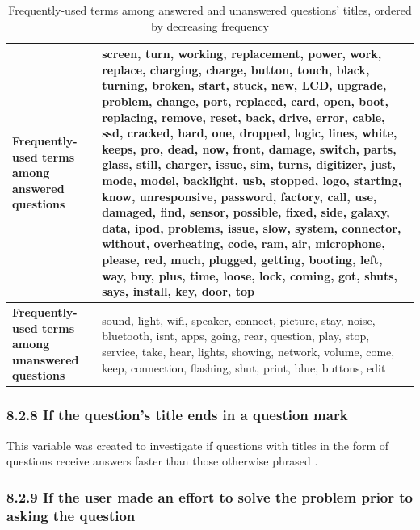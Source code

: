 \documentclass{article}
\begin{document}
\begin{table}[!htbp]
\centering
\begin{tabular}{|L{4cm}|L{8cm}|}
  \hline
 \textbf{Frequently-used terms among answered questions} & screen, turn, working, replacement, power, work, replace, charging, charge, button, touch, black, turning, broken, start, stuck, new, LCD, upgrade, problem, change, port, replaced, card, open, boot, replacing, remove, reset, back, drive, error, cable, ssd, cracked, hard, one, dropped, logic, lines, white, keeps, pro, dead, now, front, damage, switch, parts, glass, still, charger, issue, sim, turns, digitizer, just, mode, model, backlight, usb, stopped, logo, starting, know, unresponsive, password, factory, call, use, damaged, find, sensor, possible, fixed, side, galaxy, data, ipod, problems, issue, slow, system, connector, without, overheating, code, ram, air, microphone, please, red, much, plugged, getting, booting, left, way, buy, plus, time, loose, lock, coming, got, shuts, says, install, key, door, top \\
  \hline
  \textbf{Frequently-used terms among unanswered questions} & sound, light, wifi, speaker, connect, picture, stay, noise, bluetooth, isnt, apps, going, rear, question, play, stop, service, take, hear, lights, showing, network, volume, come, keep, connection, flashing, shut, print, blue, buttons, edit \\ 
   \hline
\end{tabular}
\caption{Frequently-used terms among answered and unanswered questions' titles, ordered by decreasing frequency}
\label{table:frequentterms}
\end{table}


\subsubsection*{8.2.8 If the question's title ends in a question mark}

This variable was created to investigate if questions with titles in the form of questions receive answers faster than those otherwise phrased \cite{Bhat2014}. 


\subsubsection*{8.2.9 If the user made an effort to solve the problem prior to asking the question}
\end{document}
